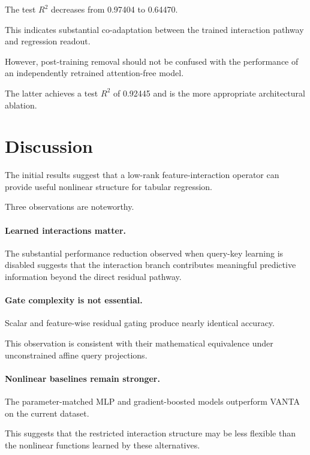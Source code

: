 \documentclass[11pt,a4paper]{article}
\begin{document}
The test $R^2$ decreases from
0.97404 to 0.64470.

This indicates substantial
co-adaptation between the trained
interaction pathway and regression
readout.

However, post-training removal
should not be confused with the
performance of an independently
retrained attention-free model.

The latter achieves a test $R^2$
of 0.92445 and is the more
appropriate architectural ablation.

\section{Discussion}

The initial results suggest that
a low-rank feature-interaction operator
can provide useful nonlinear structure
for tabular regression.

Three observations are noteworthy.

\paragraph{Learned interactions matter.}

The substantial performance reduction
observed when query-key learning is
disabled suggests that the interaction
branch contributes meaningful predictive
information beyond the direct residual
pathway.

\paragraph{Gate complexity is not essential.}

Scalar and feature-wise residual gating
produce nearly identical accuracy.

This observation is consistent with
their mathematical equivalence under
unconstrained affine query projections.

\paragraph{Nonlinear baselines remain stronger.}

The parameter-matched MLP and
gradient-boosted models outperform VANTA
on the current dataset.

This suggests that the restricted
interaction structure may be less
flexible than the nonlinear functions
learned by these alternatives.
\end{document}
